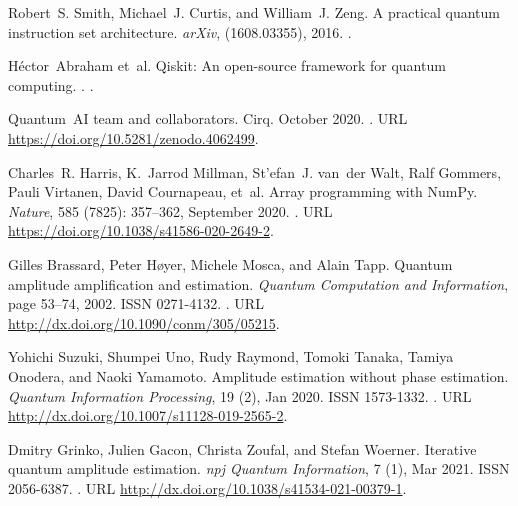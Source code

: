 \documentclass[letterpaper,preprintnumbers,preprint,aps,accepted=2022-05-26]{quantumarticle}
\begin{document}
\begin{thebibliography}{39}
Robert~S. Smith, Michael~J. Curtis, and William~J. Zeng.
\newblock A practical quantum instruction set architecture.
\newblock \emph{arXiv},  (1608.03355), 2016.
\newblock {}.

H{\'e}ctor~Abraham et~al.
\newblock Qiskit: An open-source framework for quantum computing.
.
\newblock {}.

Quantum~AI team and collaborators.
\newblock Cirq.
\newblock October 2020.
\newblock {}.
\newblock URL \url{https://doi.org/10.5281/zenodo.4062499}.

Charles~R. Harris, K.~Jarrod Millman, St{'{e}}fan~J. van~der Walt, Ralf
  Gommers, Pauli Virtanen, David Cournapeau, et~al.
\newblock Array programming with {NumPy}.
\newblock \emph{Nature}, 585 (7825): 357--362, September
  2020.
\newblock {}.
\newblock URL \url{https://doi.org/10.1038/s41586-020-2649-2}.

Gilles Brassard, Peter Høyer, Michele Mosca, and Alain Tapp.
\newblock Quantum amplitude amplification and estimation.
\newblock \emph{Quantum Computation and Information}, page 53–74, 2002.
\newblock ISSN 0271-4132.
\newblock {}.
\newblock URL \url{http://dx.doi.org/10.1090/conm/305/05215}.

Yohichi Suzuki, Shumpei Uno, Rudy Raymond, Tomoki Tanaka, Tamiya Onodera, and
  Naoki Yamamoto.
\newblock Amplitude estimation without phase estimation.
\newblock \emph{Quantum Information Processing}, 19 (2), Jan 2020.
\newblock ISSN 1573-1332.
\newblock {}.
\newblock URL \url{http://dx.doi.org/10.1007/s11128-019-2565-2}.

Dmitry Grinko, Julien Gacon, Christa Zoufal, and Stefan Woerner.
\newblock Iterative quantum amplitude estimation.
\newblock \emph{npj Quantum Information}, 7 (1), Mar 2021.
\newblock ISSN 2056-6387.
\newblock {}.
\newblock URL \url{http://dx.doi.org/10.1038/s41534-021-00379-1}.


\end{thebibliography}
\end{document}
